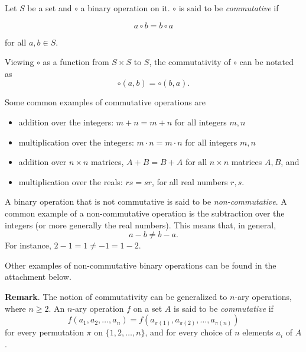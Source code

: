 \documentclass[12pt]{article}
\begin{document}
Let $S$ be a set and $\circ$ a binary operation on it.  $\circ$ is said to be \emph{commutative} if

$$a \circ b = b \circ a$$

for all $a,b \in S$.

Viewing $\circ$ as a function from $S\times S$ to $S$, the commutativity of $\circ$ can be notated as $$\circ(a,b)=\circ(b,a).$$

Some common examples of commutative operations are 
\begin{itemize}
\item addition over the integers: $m+n=m+n$ for all integers $m,n$
\item multiplication over the integers: $m\cdot n=m\cdot n$ for all integers $m,n$
\item addition over $n \times n$ matrices, $A+B=B+A$ for all $n\times n$ matrices $A,B$, and
\item multiplication over the reals: $rs=sr$, for all real numbers $r,s$.
\end{itemize}

A binary operation that is not commutative is said to be \emph{non-commutative}.  A common example of a non-commutative operation is the subtraction over the integers (or more generally the real numbers).  This means that, in general, $$a-b\ne b-a.$$  For instance, $2-1=1\ne -1 = 1-2$.

Other examples of non-commutative binary operations can be found in the attachment below.

\textbf{Remark}.  The notion of commutativity can be generalized to $n$-ary operations, where $n\ge 2$.  An $n$-ary operation $f$ on a set $A$ is said to be \emph{commutative} if 
$$f(a_1,a_2,\ldots, a_n)=f(a_{\pi(1)},a_{\pi(2)},\ldots, a_{\pi(n)})$$ 
for every permutation $\pi$ on $\lbrace 1,2,\ldots, n\rbrace$, and for every choice of $n$ elements $a_i$ of $A$.
\end{document}

